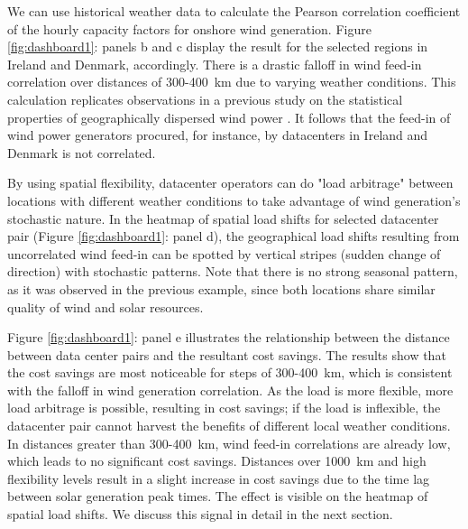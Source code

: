 We can use historical weather data to calculate the Pearson correlation coefficient of the  hourly capacity factors for onshore wind generation. Figure \ref{fig:dashboard1}: panels b and c display the result for the selected regions in Ireland and Denmark, accordingly. There is a drastic falloff in wind feed-in correlation over distances of 300-400~km due to varying weather conditions. This calculation replicates observations in a previous study on the statistical properties of geographically dispersed wind power \cite{hascheGeneralStatisticsGeographically2010}. It follows that the feed-in of wind power generators procured, for instance, by datacenters in Ireland and Denmark is not correlated.

By using spatial flexibility, datacenter operators can do "load arbitrage" between locations with different weather conditions to take advantage of wind generation's stochastic nature. In the heatmap of spatial load shifts for selected datacenter pair (Figure \ref{fig:dashboard1}: panel d), the geographical load shifts resulting from uncorrelated wind feed-in can be spotted by vertical stripes (sudden change of direction) with stochastic patterns. Note that there is no strong seasonal pattern, as it was observed in the previous example, since both locations share similar quality of wind and solar resources.

Figure \ref{fig:dashboard1}: panel e illustrates the relationship between the distance between data center pairs and the resultant cost savings. The results show that the cost savings are most noticeable for steps of 300-400~km, which is consistent with the falloff in wind generation correlation. As the load is more flexible, more load arbitrage is possible, resulting in cost savings; if the load is inflexible, the datacenter pair cannot harvest the benefits of different local weather conditions. In distances greater than 300-400~km, wind feed-in correlations are already low, which leads to no significant cost savings. Distances over 1000~km and high flexibility levels result in a slight increase in cost savings due to the time lag between solar generation peak times.  The effect is visible on the heatmap of spatial load shifts. We discuss this signal in detail in the next section.


